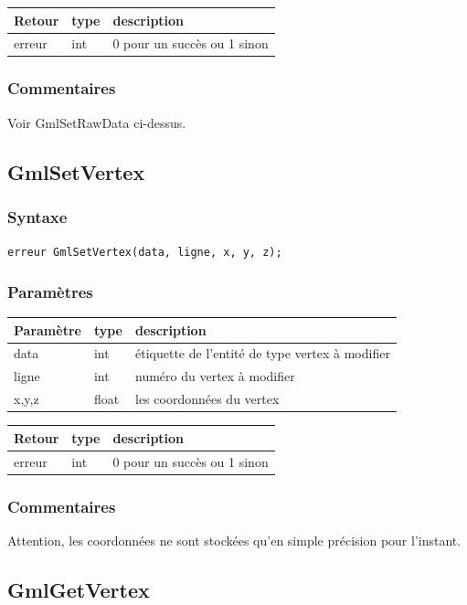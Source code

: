 \documentclass[a4paper,12pt]{article}
\begin{document}
\medskip

\begin{tabular}{|m{2cm}|m{1.5cm}|m{10.5cm}|}
\hline
Retour     & type   & description \\
\hline
erreur     & int    & 0 pour un succès ou 1 sinon \\
\hline
\end{tabular}
\subsubsection*{Commentaires}
Voir GmlSetRawData ci-dessus.


\subsection{GmlSetVertex}
\subsubsection*{Syntaxe}
{\tt erreur GmlSetVertex(data, ligne, x, y, z);}
\subsubsection*{Paramètres}

\begin{tabular}{|m{2cm}|m{1.5cm}|m{10.5cm}|}
\hline
Paramètre  & type   & description \\
\hline
data       & int    & étiquette de l'entité de type vertex à modifier \\
\hline
ligne      & int    & numéro du vertex à modifier \\
\hline
x,y,z      & float  & les coordonnées du vertex \\
\hline
\end{tabular}

\medskip

\begin{tabular}{|m{2cm}|m{1.5cm}|m{10.5cm}|}
\hline
Retour     & type   & description \\
\hline
erreur     & int    & 0 pour un succès ou 1 sinon \\
\hline
\end{tabular}
\subsubsection*{Commentaires}
Attention, les coordonnées ne sont stockées qu'en simple précision pour l'instant.


\subsection{GmlGetVertex}
\end{document}
